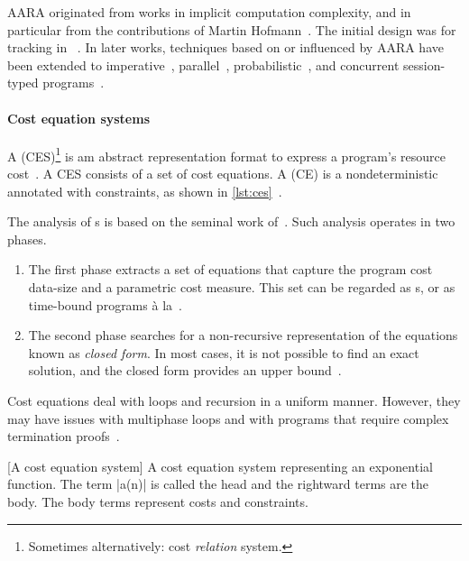 AARA originated from works in implicit computation complexity, and in particular
from the contributions of Martin Hofmann~\cite{hoffmann2022}. The initial design
was for tracking  in ~\cite{hoffmann2012}. In later works, techniques based on or influenced
by AARA have been extended to imperative~\cite{carbonneaux2015,carbonneaux2017}, parallel~\cite{hoffmann2015}, probabilistic~\cite{avanzini2020,ngo2018,wang2020}, and concurrent session-typed
programs~\cite{das2018,das2021}.

\paragraph*{Cost equation systems}
A \emph{} (CES)\footnote{Sometimes alternatively: cost
\emph{relation} system.} is am abstract representation format to express a
program's resource cost~\cite{floresmontoya2017,albert2019}. A CES consists of a
set of cost equations. A \emph{} (CE) is a
nondeterministic  annotated with
constraints, as shown in \autoref{lst:ces}~\cite{floresmontoya2014}.

The analysis of s is based on the seminal work
of~\textcite{wegbreit1975}. Such analysis operates in two phases.

\begin{enumerate}
\item The first phase extracts a set of equations that capture the program cost
\wrt data-size and a parametric cost measure. This set can be regarded as
s, or as time-bound programs à
la~\textcite{rosendahl1989}.

\item The second phase searches for a non-recursive representation of the
equations known as \emph{closed form}. In most cases, it is not possible to find
an exact solution, and the closed form provides an upper
bound~\cite{albert2008}.
\end{enumerate}

Cost equations deal with loops and recursion in a uniform manner. However, they
may have issues with multiphase loops and with programs that require complex
termination proofs~\cite{floresmontoya2014}.

\begin{center}
\begin{minipage}{\textwidth}
\captionsetup{type=lstlisting}
[A cost equation system]{
A cost equation system representing an exponential function.
The term \pr|a(n)| is called the {head} and the rightward terms are the {body}.
The body terms represent costs and constraints.}
\label{lst:ces}
\end{minipage}
\end{center}

